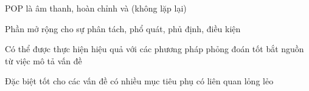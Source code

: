 \documentclass{article}
\begin{document}
\begin{huge}
POP là âm thanh, hoàn chỉnh và  (không lặp lại)

Phần mở rộng cho sự phân tách, phổ quát, phủ định, điều kiện

Có thể được thực hiện hiệu quả với các phương pháp phỏng đoán tốt bắt nguồn từ việc mô tả vấn đề

Đặc biệt tốt cho các vấn đề có nhiều mục tiêu phụ có liên quan lỏng lẻo



\vspace*{0.3in}

\textwidth
{}


\vspace*{0.1in}

\textwidth
{}





\vspace*{0.1in}

\textwidth
{}




\vspace*{0.1in}

\textwidth
{}




\vspace*{0.1in}

\textwidth
{}




\end{huge} 
\end{document}
